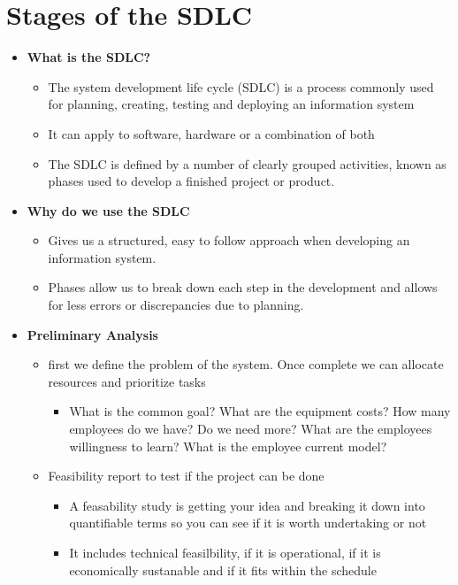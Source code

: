 \documentclass[12pt, a4, twoside]{article}
\begin{document}
  \section{Stages of the SDLC}
  \begin{itemize}
    \item \textbf{What is the SDLC?}
    \begin{itemize}
      \item The system development life cycle (SDLC) is a process commonly used for planning, creating, testing and deploying an information system
      \item It can apply to software, hardware or a combination of both
      \item The SDLC is defined by a number of clearly grouped activities, known as phases used to develop a finished project or product.
    \end{itemize}
    \item \textbf{Why do we use the SDLC}
    \begin{itemize}
      \item Gives us a structured, easy to follow approach when developing an information system.
      \item Phases allow us to break down each step in the development and allows for less errors or discrepancies due to planning.
    \end{itemize}
    \item \textbf{Preliminary Analysis}
    \begin{itemize}
      \item first we define the problem of the system. Once complete we can allocate resources and prioritize tasks
      \begin{itemize}
        \item What is the common goal? What are the equipment costs? How many employees do we have? Do we need more? What are the employees willingness to learn? What is the employee current model?
      \end{itemize}
      \item Feasibility report to test if the project can be done
      \begin{itemize}
        \item A feasability study is getting your idea and breaking it down into quantifiable terms so you can see if it is worth undertaking or not
        \item It includes technical feasilbility, if it is operational, if it is economically sustanable and if it fits within the schedule

\end{itemize}
\end{itemize}
\end{itemize}
\end{document}
